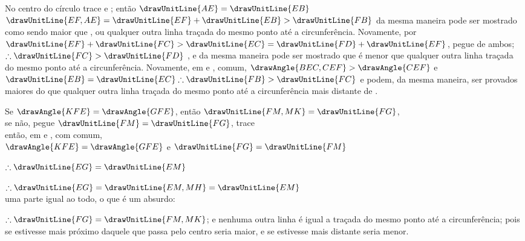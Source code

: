 \documentclass[booklanguage=brazilian]{byrnebook}
\begin{document}
No centro do círculo trace  e ; então $\drawUnitLine{AE} = \drawUnitLine{EB}$  $\drawUnitLine{EF,AE} = \drawUnitLine{EF} + \drawUnitLine{EB} > \drawUnitLine{FB}$  da mesma maneira  pode ser mostrado como sendo maior que , ou qualquer outra linha traçada do mesmo ponto até a circunferência. Novamente, por  $\drawUnitLine{EF} + \drawUnitLine{FC} > \drawUnitLine{EC} = \drawUnitLine{FD} + \drawUnitLine{EF}$, pegue  de ambos; $\therefore \drawUnitLine{FC} > \drawUnitLine{FD}$ , e da mesma maneira pode ser mostrado que  é menor que qualquer outra linha traçada do mesmo ponto até a circunferência. Novamente, em  e ,  comum, $\drawAngle{BEC,CEF} > \drawAngle{CEF}$ e $\drawUnitLine{EB} = \drawUnitLine{EC} \therefore \drawUnitLine{FB} > \drawUnitLine{FC}$  e  podem, da mesma maneira, ser provados maiores do que qualquer outra linha traçada do mesmo ponto até a circunferência mais distante de .

\begin{center}
Se $\drawAngle{KFE} = \drawAngle{GFE}$, então $\drawUnitLine{FM,MK} = \drawUnitLine{FG}$,\\
se não, pegue $\drawUnitLine{FM} = \drawUnitLine{FG}$, trace \\
então, em  e , com  comum,\\
$\drawAngle{KFE} = \drawAngle{GFE}$ e $\drawUnitLine{FG} = \drawUnitLine{FM}$

$\therefore \drawUnitLine{EG} = \drawUnitLine{EM}$ 

$\therefore \drawUnitLine{EG} = \drawUnitLine{EM,MH} = \drawUnitLine{EM}$\\
uma parte igual ao todo, o que é um absurdo:
\end{center}

\noindent $\therefore \drawUnitLine{FG} = \drawUnitLine{FM,MK}$; e nenhuma outra linha é igual a  traçada do mesmo ponto até a circunferência; pois se estivesse mais próximo daquele que passa pelo centro seria maior, e se estivesse mais distante seria menor.
\end{document}
